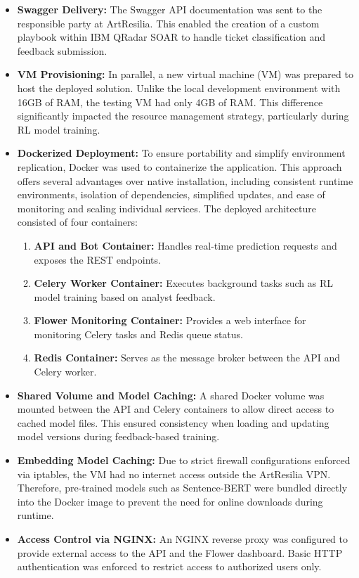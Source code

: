 \begin{itemize}
    \item \textbf{Swagger Delivery:} The Swagger API documentation was sent to the responsible party at ArtResilia. This enabled the creation of a custom playbook within IBM QRadar SOAR to handle ticket classification and feedback submission.
    \item \textbf{VM Provisioning:} In parallel, a new virtual machine (VM) was prepared to host the deployed solution. Unlike the local development environment with 16GB of RAM, the testing VM had only 4GB of RAM. This difference significantly impacted the resource management strategy, particularly during RL model training.
    \item \textbf{Dockerized Deployment:} To ensure portability and simplify environment replication, Docker was used to containerize the application. This approach offers several advantages over native installation, including consistent runtime environments, isolation of dependencies, simplified updates, and ease of monitoring and scaling individual services. The deployed architecture consisted of four containers:
    \begin{enumerate}
        \item \textbf{API and Bot Container:} Handles real-time prediction requests and exposes the REST endpoints.
        \item \textbf{Celery Worker Container:} Executes background tasks such as RL model training based on analyst feedback.
        \item \textbf{Flower Monitoring Container:} Provides a web interface for monitoring Celery tasks and Redis queue status.
        \item \textbf{Redis Container:} Serves as the message broker between the API and Celery worker.
    \end{enumerate}
    \item \textbf{Shared Volume and Model Caching:} A shared Docker volume was mounted between the API and Celery containers to allow direct access to cached model files. This ensured consistency when loading and updating model versions during feedback-based training.
    \item \textbf{Embedding Model Caching:} Due to strict firewall configurations enforced via iptables, the VM had no internet access outside the ArtResilia VPN. Therefore, pre-trained models such as Sentence-BERT were bundled directly into the Docker image to prevent the need for online downloads during runtime.
    \item \textbf{Access Control via NGINX:} An NGINX reverse proxy was configured to provide external access to the API and the Flower dashboard. Basic HTTP authentication was enforced to restrict access to authorized users only.
\end{itemize}

